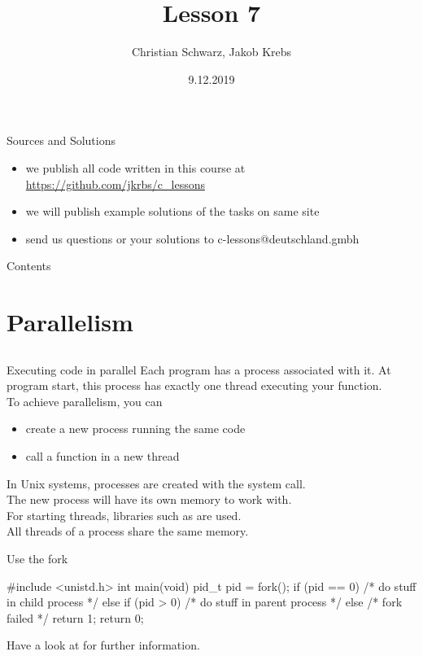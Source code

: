 \documentclass[10pt,graphics,aspectratio=169,table]{beamer}
\title{Lesson 7}
\author{Christian Schwarz, Jakob Krebs}
\date{9.12.2019}
\begin{document}
\maketitle

\begin{frame}{Sources and Solutions}
    \begin{itemize}
        \item we publish all code written in this course at \url{https://github.com/jkrbs/c_lessons}
        \item we will publish example solutions of the tasks on same site
        \item send us questions or your solutions to c-lessons@deutschland.gmbh
    \end{itemize}
\end{frame}

\begin{frame}{Contents}
    \tableofcontents
\end{frame}

\section{Parallelism}
\subsection{}
\begin{frame}{Executing code in parallel}
    Each program has a process associated with it. At program start, this process has
    exactly one thread executing your  function.\\
    \bigskip
    To achieve parallelism, you can
    \begin{itemize}
            \item create a new process running the same code
            \item call a function in a new thread
    \end{itemize}
    \bigskip
    In Unix systems, processes are created with the  system call.\\
    The new process will have its own memory to work with.\\
    For starting threads, libraries such as  are used.\\
    All threads of a process share the same memory.
\end{frame}

\begin{frame}[fragile]{Use the fork}
    \begin{codeblock}
#include <unistd.h>
int main(void) {
    pid_t pid = fork();
    if (pid == 0) {
        /* do stuff in child process */
    } else if (pid > 0) {
        /* do stuff in parent process */
    } else {
        /* fork failed */
        return 1;
    }
    return 0;
}
\end{codeblock}

    Have a look at  for further information.
\end{frame}
\end{document}
